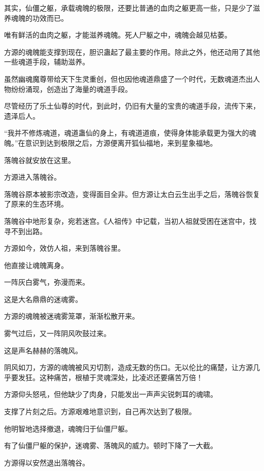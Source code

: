 
\begin{this_body}



其实，仙僵之躯，承载魂魄的极限，还要比普通的血肉之躯更高一些，只是少了滋养魂魄的功效而已。

唯有鲜活的血肉之躯，才能滋养魂魄。死人尸躯之中，魂魄会越见枯萎。

方源的魂魄能支撑到现在，胆识蛊起了最主要的作用。除此之外，他还动用了其他一些魂道手段，辅助滋养。

虽然幽魂魔尊带给天下生灵重创，但也因他魂道鼎盛了一个时代，无数魂道杰出人物纷纷涌现，创造出了海量的魂道手段。

尽管经历了乐土仙尊的时代，到此时，仍旧有大量的宝贵的魂道手段，流传下来，遗泽后人。

“我并不修炼魂道，魂道蛊仙的身上，有魂道道痕，使得身体能承载更为强大的魂魄。”在意识到达到极限之后，方源便离开狐仙福地，来到星象福地。

落魄谷就安放在这里。

方源进入落魄谷。

落魄谷原本被影宗改造，变得面目全非。但方源让太白云生出手之后，落魄谷恢复了原来的生态环境。

落魄谷中地形复杂，宛若迷宫。《人祖传》中记载，当初人祖就受困在迷宫中，找寻不到出路。

方源如今，效仿人祖，来到落魄谷里。

他直接让魂魄离身。

一阵灰白雾气，弥漫而来。

这是大名鼎鼎的迷魂雾。

方源的魂魄被迷魂雾笼罩，渐渐松散开来。

雾气过后，又一阵阴风吹鼓过来。

这是声名赫赫的落魄风。

阴风如刀，方源的魂魄被风刃切割，造成无数的伤口。无以伦比的痛楚，让方源几乎要发狂。这种痛苦，根植于灵魂深处，比凌迟还要痛苦万倍！

方源仰头怒吼，但他缺少了肉身，只能发出一声声尖锐刺耳的魂啸。

支撑了片刻之后。方源艰难地意识到，自己再次达到了极限。

他明智地选择撤退，魂魄归于仙僵尸躯。

有了仙僵尸躯的保护，迷魂雾、落魄风的威力。顿时下降了一大截。

方源得以安然退出落魄谷。


\end{this_body}
